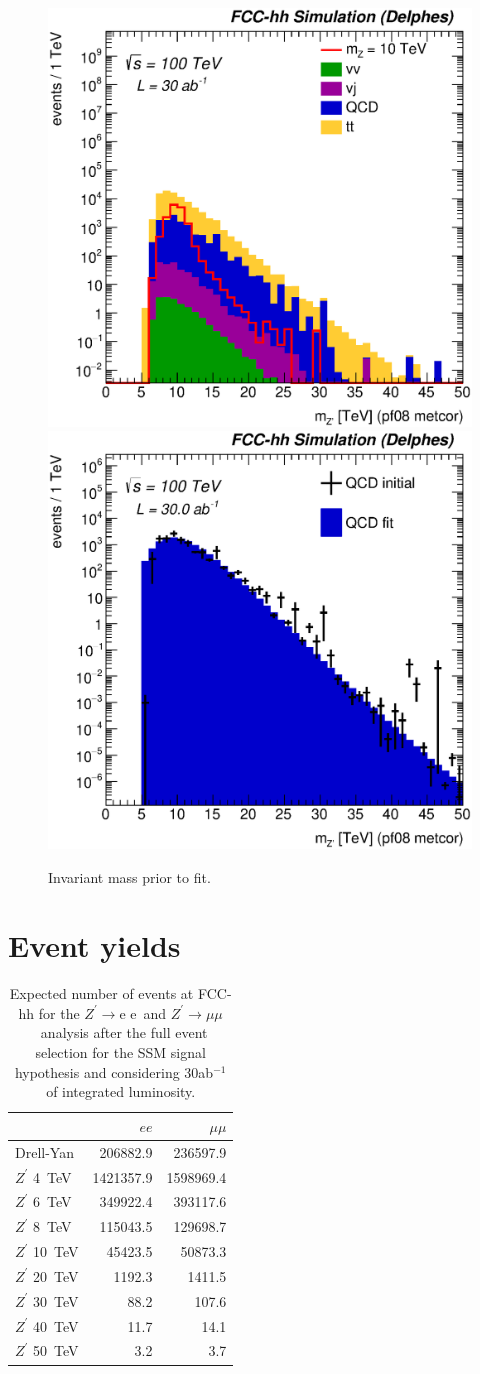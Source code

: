 \documentclass[a4paper,11pt]{article}
\newcommand{\Zp}{\ensuremath{Z^{\prime}}}
\newcommand*{\Zpee}{\ensuremath{Z^{\prime}\rightarrow \text{e e}}}
\newcommand*{\Zpmumu}{\ensuremath{Z^{\prime}\rightarrow \mu\mu}}
\begin{document}
\begin{figure}[!htb]\centering
\includegraphics[width=0.45\columnwidth]{Fig/Zptt/Mj1j2_pf08_MetCorr_sel8_nostack_log.eps}
\includegraphics[width=0.45\columnwidth]{Fig/Zptt/Zptt_QCD_sel8_Mj1j2_pf08_MetCorr_fit.eps}
\caption{Invariant mass prior to fit.}
\label{fig:hadronicresonances_nofit}
\end{figure}


\section{Event yields}
\label{app:yields}
\begin{table}[htbp]
   \centering
\begin{tabular}{|l|r|r|}
  \hline
 & $ee$ & $\mu\mu$  \\
  \hline
  Drell-Yan & 206882.9 & 236597.9 \\
  \hline
  $\Zp$ 4~TeV & 1421357.9    & 1598969.4 \\
  $\Zp$ 6~TeV & 349922.4  & 393117.6\\
  $\Zp$ 8~TeV &   115043.5 & 129698.7 \\
  $\Zp$ 10~TeV &  45423.5 & 50873.3 \\
  $\Zp$ 20~TeV &  1192.3 & 1411.5\\
  $\Zp$ 30~TeV &  88.2 & 107.6\\
  $\Zp$ 40~TeV &  11.7 & 14.1 \\
  $\Zp$ 50~TeV &  3.2 & 3.7\\
  \hline
  \hline
\end{tabular}
  \caption{Expected number of events at FCC-hh for the \Zpee\ and \Zpmumu\ analysis after the full event selection for the SSM signal hypothesis and considering 30ab$^{-1}$ of integrated luminosity.}
  \label{tab:leptonicresonances:yieldsll}
\end{table}
\end{document}
